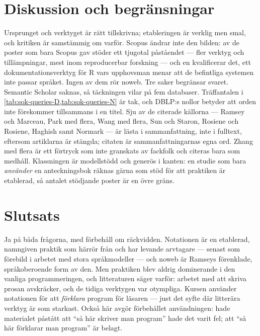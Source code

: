 \section{Diskussion och begränsningar}
\label{sec:litprog-diskussion}

Ursprunget och verktyget är rätt tillskrivna; etableringen är verklig
men smal, och kritiken är samstämmig om varför.  Scopus ändrar inte den
bilden: av de poster som bara Scopus gav stöder ett tjugotal påståendet
--- fler verktyg och tillämpningar, mest inom reproducerbar forskning ---
och en kvalificerar det, ett dokumentationsverktyg för R vars upphovsman
menar att de befintliga systemen inte passar språket.  Ingen av dem rör
noweb.  Tre saker begränsar
svaret.  Semantic Scholar saknas, så täckningen vilar på fem
databaser.  Träffantalen i
\cref{tab:sok-queries-D,tab:sok-queries-N} är tak, och DBLP:s nollor betyder att orden inte
förekommer tillsammans i en titel.  Sju av de citerade källorna ---
Ramsey och Marceau, Park med flera, Wang med flera, Sun och Staron,
Rosiene och Rosiene, Haghish samt Normark --- är lästa i sammanfattning,
inte i fulltext, eftersom artiklarna är stängda; citaten är
sammanfattningarnas egna ord.
Zhang med flera är ett förtryck som inte granskats av fackfolk och
citeras bara som medhåll.  Klassningen är modellstödd och generös i kanten: en studie
som bara \emph{använder} en anteckningsbok räknas gärna som stöd för att
praktiken är etablerad, så antalet stödjande poster är en övre gräns.

\section{Slutsats}
\label{sec:litprog-slutsats}

Ja på båda frågorna, med förbehåll om räckvidden.  Notationen är en
etablerad, namngiven praktik som härrör från \textcite{knuth1984} och har
levande arvtagare --- senast som förebild i arbetet med stora
språkmodeller --- och noweb är Ramseys förenklade, språkoberoende form
av den\autocite{Ramsey1994Noweb}.  Men praktiken blev aldrig dominerande
i den vanliga programmeringen, och litteraturen säger varför: arbetet med
att skriva prosan avskräcker, och de tidiga verktygen var otympliga.
Kursen använder notationen för att \emph{förklara} program för läsaren
--- just det syfte där litterära verktyg är som starkast.  Också här
avgör förbehållet användningen: hade materialet påstått att \enquote{så
här skriver man program} hade det varit fel; att \enquote{så här
förklarar man program} är belagt.

